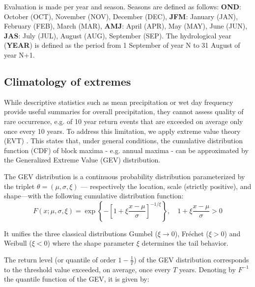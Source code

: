 \documentclass[hess, manuscript]{copernicus}
\begin{document}
Evaluation is made per year and season. Seasons are defined as follows: \textbf{OND}:
October (OCT), November (NOV), December (DEC), \textbf{JFM}: January
(JAN), February (FEB), March (MAR), \textbf{AMJ}: April (APR), May
(MAY), June (JUN), \textbf{JAS}: July (JUL), August (AUG), September
(SEP). The hydrological year (\textbf{YEAR}) is defined as the period
from 1 September of year N to 31 August of year N+1.

\subsection{Climatology of extremes}\label{climatology}


While descriptive statistics such as mean precipitation or wet day frequency provide useful summaries for overall precipitation, they cannot assess quality of rare occurrence, e.g. of 10 year return events that are exceeded on average only once every 10 years. %
To address
this limitation, we apply extreme value theory (EVT) \citep{coles2001introduction}. This states that, under general conditions, the cumulative distribution function (CDF) of block maxima - e.g. annual maxima - can be approximated by the Generalized Extreme Value (GEV)
distribution.

The GEV distribution is a continuous
probability distribution parameterized by the triplet
\(\theta = (\mu, \sigma, \xi)\) --- respectively the location, scale
(strictly positive), and shape---with the following cumulative
distribution function: \[
F(x;\mu ,\sigma ,\xi) = \exp\left\{-\left[1 + \xi\frac{x - \mu}{\sigma}\right]^{-1/\xi}\right\}, \quad 1 + \xi\frac{x - \mu}{\sigma} > 0
\]

It unifies the three classical distributions Gumbel (\(\xi \to 0\)), Fréchet (\(\xi > 0\)) and Weibull (\(\xi < 0\)) where the shape parameter \(\xi\) determines the tail behavior.

The return level (or quantile of order \(1 - \tfrac{1}{T}\)) of the GEV
distribution corresponds to the threshold value exceeded, on
average, once every \(T\) years. 
Denoting by $F^{-1}$ the quantile function of the GEV, it is given by:
\end{document}
